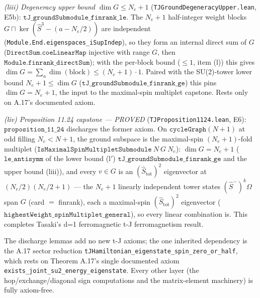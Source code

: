 \documentclass[a4paper,11pt]{article}
\begin{document}
\emph{(liii) Degeneracy upper bound $\dim G\le N_e+1$}
(\texttt{TJGroundDegeneracyUpper.lean}, E5b): $\texttt{tJ\_groundSubmodule\_finrank\_le}$.
The $N_e+1$ half-integer weight blocks $G\sqcap\ker(\hat S^3-(a-N_e/2))$ are independent
(\texttt{Module.End.eigenspaces\_iSupIndep}), so they form an internal direct sum of $G$
($\texttt{DirectSum.coeLinearMap}$ injective with range $G$, then
$\texttt{Module.finrank\_directSum}$); with the per-block bound ($\le 1$, item (l)) this gives
$\dim G=\sum_a\dim(\text{block})\le (N_e+1)\cdot 1$.  Paired with the SU(2)-tower lower bound
$N_e+1\le\dim G$ ($\texttt{tJ\_groundSubmodule\_finrank\_ge}$) this pins $\dim G=N_e+1$, the input to
the maximal-spin multiplet capstone.  Rests only on A.17's documented axiom.

\emph{(liv) Proposition 11.24 capstone --- PROVED} (\texttt{TJProposition1124.lean}, E6):
$\texttt{proposition\_11\_24}$ discharges the former axiom.  On $\texttt{cycleGraph}(N+1)$ at odd
filling $N_e<N+1$, the ground subspace is the maximal-spin $(N_e+1)$-fold multiplet
($\texttt{IsMaximalSpinMultipletSubmodule}\ N\ G\ N_e$): $\dim G=N_e+1$ ($\texttt{le\_antisymm}$ of
the lower bound (l$'$) $\texttt{tJ\_groundSubmodule\_finrank\_ge}$ and the upper bound (liii)), and
every $v\in G$ is an $(\hat S_{\mathrm{tot}})^2$ eigenvector at $(N_e/2)(N_e/2+1)$ --- the $N_e+1$
linearly independent tower states $(\hat S^-)^k\Omega$ span $G$ (card $=$ finrank), each a maximal-spin
$(\hat S_{\mathrm{tot}})^2$ eigenvector ($\texttt{highestWeight\_spinMultiplet\_general}$), so every
linear combination is.  This completes Tasaki's d=1 ferromagnetic t-J ferromagnetism result.

The discharge lemmas add no
new t-J axioms; the one inherited dependency is the A.17 sector reduction
\texttt{tJHamiltonian\_eigenstate\_spin\_zero\_or\_half}, which rests on Theorem A.17's single
documented axiom \texttt{exists\_joint\_su2\_energy\_eigenstate}.  Every other layer (the
hop/exchange/diagonal sign computations and the matrix-element machinery) is fully axiom-free.
\end{document}
